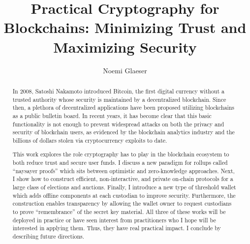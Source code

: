 \documentclass{article}
\title{Practical Cryptography for Blockchains: Minimizing Trust and Maximizing Security}
\author{Noemi Glaeser}
\date{}
\newcommand{\noemi}[1]{\textcolor{magenta}{Noemi: #1}}
\begin{document}
\maketitle
\begin{abstract}
In 2008, Satoshi Nakamoto introduced Bitcoin, the first digital currency without a trusted authority whose security is maintained by a decentralized blockchain. Since then, a plethora of decentralized applications have been proposed utilizing blockchains as a public bulletin board. In recent years, it has become clear that this basic functionality is not enough to prevent widespread attacks on both the privacy and security of blockchain users, as evidenced by the blockchain analytics industry and the billions of dollars stolen via cryptocurrency exploits to date. 

This work explores the role cryptography has to play in the blockchain ecosystem to both reduce trust and secure user funds. 
I discuss a new paradigm for rollups called ``naysayer proofs'' which sits between optimistic and zero-knowledge approaches.
Next, I show how to construct efficient, non-interactive, and private on-chain protocols for a large class of elections and auctions. 
Finally, I introduce a new type of threshold wallet which adds offline components at each custodian to improve security. Furthermore, the construction enables transparency by allowing the wallet owner to request custodians to prove ``remembrance'' of the secret key material.
All three of these works will be deployed in practice or have seen interest from practitioners who I hope will be interested in applying them. Thus, they have real practical impact.
I conclude by describing future directions.

\end{abstract}
\end{document}
